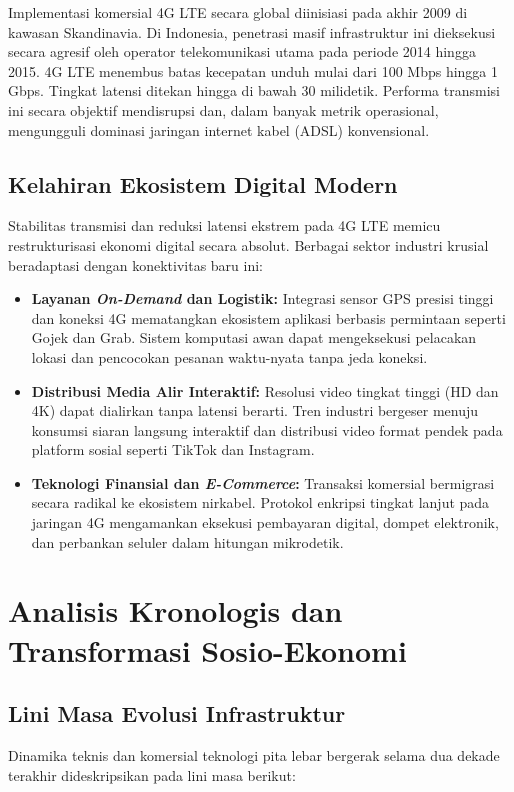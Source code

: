 \documentclass[12pt,a4paper]{article}
\begin{document}
Implementasi komersial 4G LTE secara global diinisiasi pada akhir 2009 di kawasan Skandinavia. Di Indonesia, penetrasi masif infrastruktur ini dieksekusi secara agresif oleh operator telekomunikasi utama pada periode 2014 hingga 2015. 4G LTE menembus batas kecepatan unduh mulai dari 100 Mbps hingga 1 Gbps. Tingkat latensi ditekan hingga di bawah 30 milidetik. Performa transmisi ini secara objektif mendisrupsi dan, dalam banyak metrik operasional, mengungguli dominasi jaringan internet kabel (ADSL) konvensional.

\subsection{Kelahiran Ekosistem Digital Modern}
Stabilitas transmisi dan reduksi latensi ekstrem pada 4G LTE memicu restrukturisasi ekonomi digital secara absolut. Berbagai sektor industri krusial beradaptasi dengan konektivitas baru ini:
\begin{itemize}
\item \textbf{Layanan \textit{On-Demand} dan Logistik:} Integrasi sensor GPS presisi tinggi dan koneksi 4G mematangkan ekosistem aplikasi berbasis permintaan seperti Gojek dan Grab. Sistem komputasi awan dapat mengeksekusi pelacakan lokasi dan pencocokan pesanan waktu-nyata tanpa jeda koneksi.
\item \textbf{Distribusi Media Alir Interaktif:} Resolusi video tingkat tinggi (HD dan 4K) dapat dialirkan tanpa latensi berarti. Tren industri bergeser menuju konsumsi siaran langsung interaktif dan distribusi video format pendek pada platform sosial seperti TikTok dan Instagram.
\item \textbf{Teknologi Finansial dan \textit{E-Commerce}:} Transaksi komersial bermigrasi secara radikal ke ekosistem nirkabel. Protokol enkripsi tingkat lanjut pada jaringan 4G mengamankan eksekusi pembayaran digital, dompet elektronik, dan perbankan seluler dalam hitungan mikrodetik.
\end{itemize}

\newpage

\section{Analisis Kronologis dan Transformasi Sosio-Ekonomi}

\subsection{Lini Masa Evolusi Infrastruktur}
Dinamika teknis dan komersial teknologi pita lebar bergerak selama dua dekade terakhir dideskripsikan pada lini masa berikut:
\end{document}
